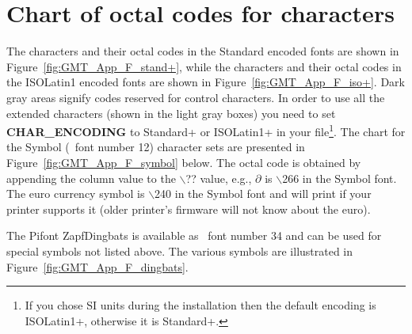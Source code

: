%
%
\chapter{Chart of octal codes for characters}
\label{app:F}
\thispagestyle{headings}


The characters and their octal codes in the Standard encoded fonts
are shown in Figure~\ref{fig:GMT_App_F_stand+}, while the characters and their octal codes in the ISOLatin1
encoded fonts are shown in Figure~\ref{fig:GMT_App_F_iso+}.   Dark gray areas signify codes reserved for
control characters.  In order to use all the extended characters (shown in the light gray boxes) you need to
set {\bf CHAR\_ENCODING} to Standard+ or ISOLatin1+ in your  file\footnote{If you chose
SI units during the installation then the default encoding is ISOLatin1+, otherwise it is Standard+.}.
The chart for the Symbol (\GMT\ font number 12) character
sets are presented in Figure~\ref{fig:GMT_App_F_symbol} below. The octal code is obtained by appending the
column value to the $\backslash$?? value, e.g., $\partial$ is
$\backslash$266 in the Symbol font.  The euro currency symbol is $\backslash$240 in the Symbol font and will
print if your printer supports it (older printer's firmware will not know about the euro).




The Pifont ZapfDingbats is available as \GMT\ font number 34 and
can be used for special symbols not listed above.  The various
symbols are illustrated in Figure~\ref{fig:GMT_App_F_dingbats}.

